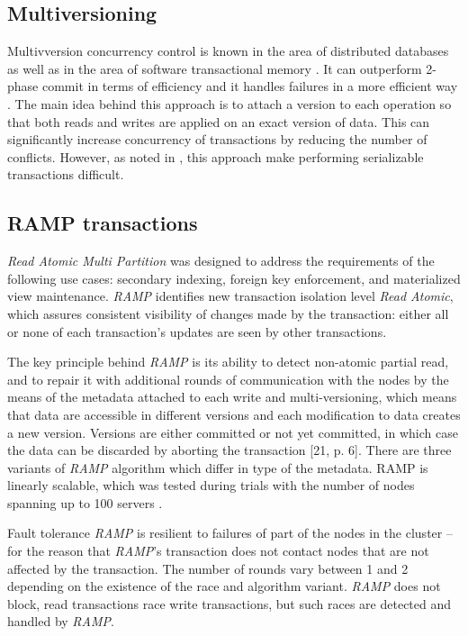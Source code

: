 \documentclass[runningheads,a4paper]{llncs}
\begin{document}
\subsection{Multiversioning} 

Multivversion concurrency control \cite{Bernstein:1983} is known in the area of distributed databases as well as in the area of software transactional memory \cite{Perelman:2010}. It can outperform 2-phase commit in terms of efficiency and it handles failures in a more efficient way \cite{Halici:1991}. The main idea behind this approach is to attach a version to each operation so that both reads and writes are applied on an exact version of data. This can significantly increase concurrency of transactions by reducing the number of conflicts. However, as noted in \cite{Faleiro:2015}, this approach make performing serializable transactions difficult.

\subsection{RAMP transactions} 
\emph{Read Atomic Multi Partition} \cite{Bailis:2014} was designed to address the requirements of the following use cases: secondary indexing, foreign key enforcement, and materialized view maintenance. \emph{RAMP} identifies new transaction isolation level \emph{Read Atomic}, which assures consistent visibility of changes made by the transaction: either all or none of each transaction’s updates are seen by other transactions.

The key principle behind \emph{RAMP} is its ability to detect non-atomic partial read, and to repair it with additional rounds of communication with the nodes by the means of the metadata attached to each write and multi-versioning, which means that data are accessible in different versions and each modification to data creates a new version. Versions are either committed or not yet committed, in which case the data can be discarded by aborting the transaction [21, p. 6]. There are three variants of \emph{RAMP} algorithm which differ in type of the metadata. RAMP is linearly scalable, which was tested during trials with the number of nodes spanning up to 100 servers \cite[p. 10]{Bailis:2014}.

Fault tolerance \emph{RAMP} is resilient to failures of part of the nodes in the cluster – for the reason that \emph{RAMP}’s transaction does not contact nodes that are not affected by the transaction. The number of rounds vary between 1 and 2 depending on the existence of the race and algorithm variant. \emph{RAMP} does not block, read transactions race write transactions, but such races are detected and handled by \emph{RAMP}.
\end{document}
